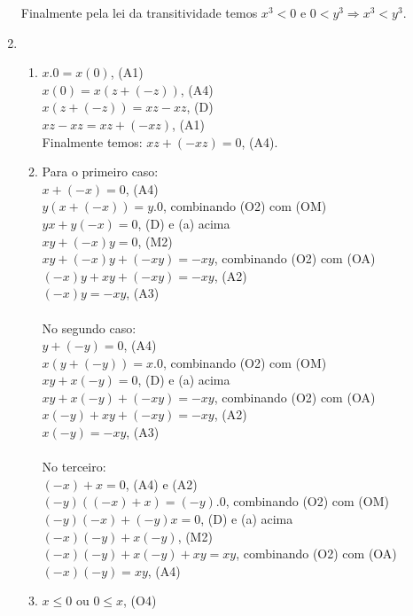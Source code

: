 \documentclass[10pt]{book}
\begin{document}
\begin{enumerate}
	Finalmente pela lei da transitividade temos $x^3 < 0$ e $0 < y^3 \Rightarrow x^3 < y^3$.
	
	\item
		\begin{enumerate}
			\item 
			$x.0 = x(0)$, (A1)\\
			$ x(0) = x(z + (-z))$, (A4)\\ 
			$x(z + (-z)) = xz - xz $, (D)\\
			$xz - xz = xz + (-xz) $, (A1)\\ 
			Finalmente temos: $xz + (-xz) = 0$, (A4).\\
			\item
			Para o primeiro caso:\\
			$x + (-x) = 0$, (A4)\\							
			$y(x + (-x)) = y.0$, combinando (O2) com (OM)\\
			$yx + y(-x) = 0$, (D) e (a) acima\\
			$xy + (-x)y = 0$, (M2)\\						
			$xy + (-x)y + (-xy) = -xy$, combinando (O2) com (OA)\\
			$(-x)y + xy + (-xy) = -xy$, (A2)\\
			$(-x)y = -xy$, (A3)\\	
			\\	
			No segundo caso:\\
			$y + (-y) = 0$, (A4)\\							
			$x(y + (-y)) = x.0$, combinando (O2) com (OM)\\
			$xy + x(-y) = 0$, (D) e (a) acima\\
			$xy + x(-y) + (-xy) = -xy$, combinando (O2) com (OA)\\
			$x(-y) + xy + (-xy) = -xy$, (A2)\\
			$x(-y) = -xy$, (A3)\\		
			\\
			No terceiro:\\
			$(-x) + x = 0$, (A4) e (A2)\\
			$(-y)((-x) + x) = (-y).0$, combinando (O2) com (OM)\\
			$(-y)(-x) + (-y)x = 0$, (D) e (a) acima\\
			$(-x)(-y) + x(-y)$, (M2)\\
			$(-x)(-y) + x(-y) + xy = xy$, combinando (O2) com (OA)\\
			$(-x)(-y) = xy$, (A4)\\
			\item
			$x \leq 0$ ou $0 \leq x$, (O4)\\

\end{enumerate}
\end{enumerate}
\end{document}
